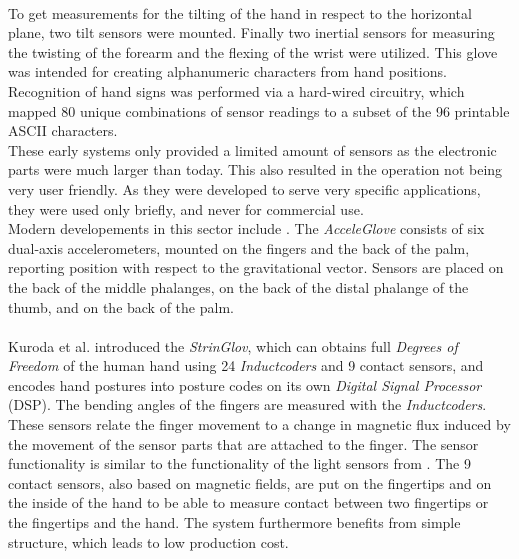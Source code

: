 \\To get measurements for the tilting of the hand in respect to the horizontal plane, two tilt sensors were mounted. Finally two inertial sensors for measuring the twisting of the forearm and the flexing of the wrist were utilized. This glove was intended for creating alphanumeric characters from hand positions. Recognition of hand signs was performed via a hard-wired circuitry, which mapped 80 unique combinations of sensor readings to a subset of the 96 printable ASCII characters.
\\These early systems only provided a limited amount of sensors as the electronic parts were much larger than today. This also resulted in the operation not being very user friendly. As they were developed to serve very specific applications, they were used only briefly, and never for commercial use.\\
Modern developements in this sector include \cite{Kuroda.2004,HernandezRebollar.2002,Majeau.2012}. The \textit{AcceleGlove} \cite{HernandezRebollar.2002} consists of six dual-axis accelerometers, mounted on the fingers and the back of the palm, reporting position with respect to the gravitational vector. Sensors are placed on the back of the middle phalanges, on the back of the distal phalange of the thumb, and on the back of the palm.\\
\\Kuroda et al. \cite{Kuroda.2004} introduced the \textit{StrinGlov}, which can obtains full \textit{Degrees of Freedom} of the human hand using 24 \textit{Inductcoders} and 9 contact sensors, and encodes hand postures into posture codes on its own \textit{Digital Signal Processor} (DSP). The bending angles of the fingers are measured with the \textit{Inductcoders}.\\These sensors relate the finger movement to a change in magnetic flux induced by the movement of the sensor parts that are attached to the finger. The sensor functionality is similar to the functionality of the light sensors from \cite{ThomasA.DeFanti.1977}. The 9 contact sensors, also based on magnetic fields, are put on the fingertips and on the inside of the hand to be able to measure contact between two fingertips or the fingertips and the hand. The system furthermore benefits from simple structure, which leads to low production cost. \\\\
